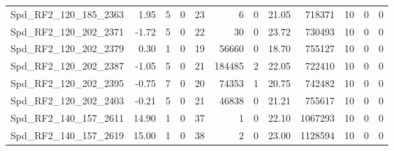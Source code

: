 \begin{longtable}[c]{@{}lrrrrrrrrrrr@{}}
Spd\_RF2\_120\_185\_2363      & 1.95                   & 5                       & 0                       & 23                     & 6                       & 0                       & 21.05                   & 718371                   & 10                       & 0                        & 0                        \\
Spd\_RF2\_120\_202\_2371      & -1.72                  & 5                       & 0                       & 22                     & 30                      & 0                       & 23.72                   & 730493                   & 10                       & 0                        & 0                        \\
Spd\_RF2\_120\_202\_2379      & 0.30                   & 1                       & 0                       & 19                     & 56660                   & 0                       & 18.70                   & 755127                   & 10                       & 0                        & 0                        \\
Spd\_RF2\_120\_202\_2387      & -1.05                  & 5                       & 0                       & 21                     & 184485                  & 2                       & 22.05                   & 722410                   & 10                       & 0                        & 0                        \\
Spd\_RF2\_120\_202\_2395      & -0.75                  & 7                       & 0                       & 20                     & 74353                   & 1                       & 20.75                   & 742482                   & 10                       & 0                        & 0                        \\
Spd\_RF2\_120\_202\_2403      & -0.21                  & 5                       & 0                       & 21                     & 46838                   & 0                       & 21.21                   & 755617                   & 10                       & 0                        & 0                        \\
Spd\_RF2\_140\_157\_2611      & 14.90                  & 1                       & 0                       & 37                     & 1                       & 0                       & 22.10                   & 1067293                  & 10                       & 0                        & 0                        \\
Spd\_RF2\_140\_157\_2619      & 15.00                  & 1                       & 0                       & 38                     & 2                       & 0                       & 23.00                   & 1128594                  & 10                       & 0                        & 0                        \\

\end{longtable}

